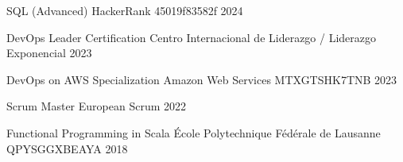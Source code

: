 

\begin{cvhonors}
  \cvhonor
  {SQL (Advanced)} %
  {HackerRank} %
  {45019f83582f} %
  {2024} %

  \cvhonor
  {DevOps Leader Certification} %
  {Centro Internacional de Liderazgo / Liderazgo Exponencial} %
  {} %
  {2023} %

  \cvhonor
  {DevOps on AWS Specialization} %
  {Amazon Web Services} %
  {MTXGTSHK7TNB} %
  {2023} %

  \cvhonor
  {Scrum Master} %
  {European Scrum} %
  {} %
  {2022} %

  \cvhonor
  {Functional Programming in Scala} %
  {École Polytechnique Fédérale de Lausanne} %
  {QPYSGGXBEAYA} %
  {2018} %

\end{cvhonors}
